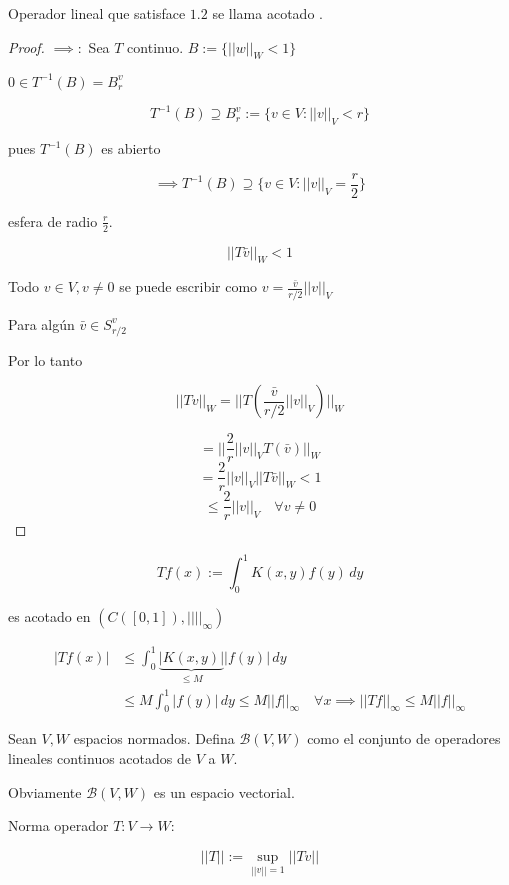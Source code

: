 \begin{fdefinition}
    Operador lineal que satisface $1.2$ se llama \color{red} acotado \color{black}.
\end{fdefinition}

\begin{proof}
    $\implies:$ Sea $T$ continuo. $B:=\{||w||_W<1\}$

    $0\in T^{-1}(B)=B_r^v$

    \[T^{-1}(B)\supseteq B_r^v:=\{v\in V:||v||_V<r\}\]

    pues $T^{-1}(B)$ es abierto 

    \[\implies T^{-1}(B)\supseteq \{v\in V:||v||_V=\frac{r}{2}\}\]

    esfera de radio $\frac{r}{2}$.

    \[||T\bar v||_W<1\]

    Todo $v\in V,v\neq 0$ se puede escribir como $v=\frac{\bar v}{r/2}||v||_V$

    Para algún $\bar v\in S_{r/2}^v$

    Por lo tanto

    \[||Tv||_W=||T(\frac{\bar v }{r/2}||v||_V)||_W\]

    \[=||\frac{2}{r}||v||_V T(\bar v)||_W\]
    \[=\frac{2}{r}||v||_V ||T\bar v||_W<1\]
    \[\leq \frac{2}{r}||v||_V\quad \forall v\neq 0\]
\end{proof}

\begin{fexample}
    \[Tf(x):=\int_0^1 K(x,y)f(y)\,dy\]

    es acotado en $(C([0,1]),||||_\infty )$

    \begin{align*}|Tf(x)|&\leq \int_0^1 \underbrace{|K(x,y)|}_{\leq M}|f(y)|\,dy\\
    &\leq M\int_0^1 |f(y)|\,dy\leq M ||f||_\infty\quad \forall x\implies ||Tf||_\infty \leq M||f||_\infty\end{align*}
\end{fexample}

\begin{fdefinition}
    Sean $V,W$ espacios normados. Defina $\mathcal{B}(V,W)$ como el conjunto de operadores lineales continuos acotados de $V$ a $W$.

    Obviamente $\mathcal{B}(V,W)$ es un espacio vectorial.
\end{fdefinition}

Norma operador $T:V\to W$:

\[||T||:=\sup_{||v||=1} ||Tv||\]

